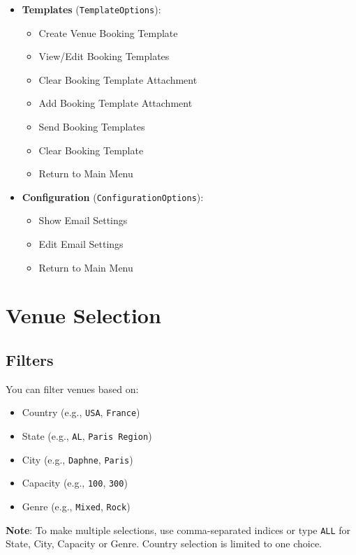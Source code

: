 \documentclass{article}
\begin{document}
\begin{itemize}
		\item \textbf{Templates} (\texttt{TemplateOptions}):
		\begin{itemize}
			\item Create Venue Booking Template
			\item View/Edit Booking Templates
			\item Clear Booking Template Attachment
			\item Add Booking Template Attachment
			\item Send Booking Templates
			\item Clear Booking Template
			\item Return to Main Menu
		\end{itemize}
		
		\item \textbf{Configuration} (\texttt{ConfigurationOptions}):
		\begin{itemize}
			\item Show Email Settings
			\item Edit Email Settings
			\item Return to Main Menu
		\end{itemize}
	\end{itemize}
	
	\section{Venue Selection}
	
	\subsection{Filters}
	
	You can filter venues based on:
	
	\begin{itemize}
		\item Country (e.g., \texttt{USA}, \texttt{France})
		\item State (e.g., \texttt{AL}, \texttt{Paris Region})
		\item City (e.g., \texttt{Daphne}, \texttt{Paris})
		\item Capacity (e.g., \texttt{100}, \texttt{300})
		\item Genre (e.g., \texttt{Mixed}, \texttt{Rock})
	\end{itemize}
	
	\textbf{Note}: To make multiple selections, use comma-separated indices or type \texttt{ALL} for State, City, Capacity or Genre. Country selection is limited to one choice.
	
\end{document}

